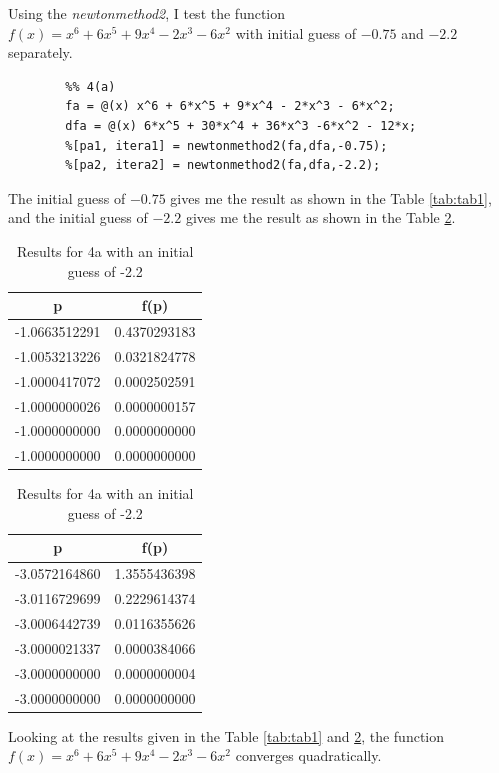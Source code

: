 \begin{answer}
    Using the \textit{newtonmethod2}, I test the function $f(x) = x^6+6x^5 + 9x^4 - 2x^3 -6x^2$ with initial guess of $-0.75$ and $-2.2$ separately. 
    \begin{verbatim}
        %% 4(a)
        fa = @(x) x^6 + 6*x^5 + 9*x^4 - 2*x^3 - 6*x^2;
        dfa = @(x) 6*x^5 + 30*x^4 + 36*x^3 -6*x^2 - 12*x;
        %[pa1, itera1] = newtonmethod2(fa,dfa,-0.75);
        %[pa2, itera2] = newtonmethod2(fa,dfa,-2.2);
    \end{verbatim}
    The initial guess of $-0.75$ gives me the result as shown in the Table \ref{tab:tab1}, and the initial guess of $-2.2$ gives me the result as shown in the Table \ref{tab:tab2}.
    \begin{table}[H]
    \parbox{.45\linewidth}{
    \centering
    \caption{Results for 4a with an initial guess of -0.75}
    \label{tab:tab1}
    \begin{tabular}{c|c}
    \textbf{p}                         & \textbf{f(p)}                    \\ \hline
    -1.0663512291                      & 0.4370293183                     \\ \hline
    -1.0053213226                      & 0.0321824778                     \\ \hline
    -1.0000417072                      & 0.0002502591                     \\ \hline
    -1.0000000026                      & 0.0000000157                     \\ \hline
    -1.0000000000                      & 0.0000000000                     \\ \hline
    \multicolumn{1}{l|}{-1.0000000000} & \multicolumn{1}{l}{0.0000000000}
    \end{tabular}
    }
    \hfill
    \parbox{.45\linewidth}{
    \centering
    \caption{Results for 4a with an initial guess of -2.2}
    \label{tab:tab2}
    \begin{tabular}{c|c}
    \textbf{p}                         & \textbf{f(p)}                    \\ \hline
    -3.0572164860                      & 1.3555436398                     \\ \hline
    -3.0116729699                      & 0.2229614374                     \\ \hline
    -3.0006442739                      & 0.0116355626                     \\ \hline
    -3.0000021337                      & 0.0000384066                     \\ \hline
    -3.0000000000                      & 0.0000000004                     \\ \hline
    \multicolumn{1}{l|}{-3.0000000000} & \multicolumn{1}{l}{0.0000000000}
    \end{tabular}
    }
    \end{table}
    Looking at the results given in the Table \ref{tab:tab1} and \ref{tab:tab2}, the function $f(x) = x^6+6x^5+9x^4-2x^3-6x^2$ converges quadratically.
\end{answer}

